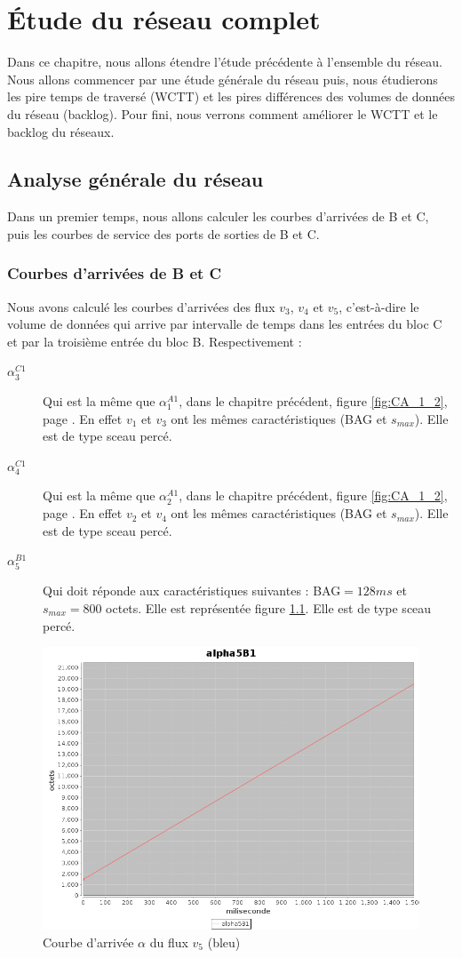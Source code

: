 \chapter{Étude du réseau complet}
Dans ce chapitre, nous allons étendre l'étude précédente à l'ensemble du réseau.
Nous allons commencer par une étude générale du réseau puis, nous étudierons les pire temps de traversé (WCTT) et les pires différences des volumes de données du réseau (backlog). Pour fini, nous verrons comment améliorer le WCTT et le backlog du réseaux.
\section{Analyse générale du réseau}
Dans un premier temps, nous allons calculer les courbes d'arrivées de B et C, puis les courbes de service des ports de sorties de B et C.
\subsection{Courbes d’arrivées de B et C}\label{sub:courbesArriveesB-C}
Nous avons calculé les courbes d'arrivées des flux $v_3$, $v_4$ et $v_5$, c'est-à-dire le volume de données qui arrive par intervalle de temps dans les entrées du bloc C et par la troisième entrée du bloc B. Respectivement : 
\begin{description}
\item[$\alpha_3^{C1}$ ] Qui est la même que $\alpha_1^{A1}$, dans le chapitre précédent, figure \ref{fig:CA_1_2}, page \pageref{fig:CA_1_2}. En effet $v_1$ et $v_3$ ont les mêmes caractéristiques (BAG et $s_{max}$). Elle est de type sceau percé.

\item[$\alpha_4^{C1}$ ] Qui est la même que $\alpha_2^{A1}$, dans le chapitre précédent, figure \ref{fig:CA_1_2}, page \pageref{fig:CA_1_2}. En effet $v_2$ et $v_4$ ont les mêmes caractéristiques (BAG et $s_{max}$). Elle est de type sceau percé.

\item[$\alpha_5^{B1}$ ] Qui doit réponde aux  caractéristiques suivantes : BAG$=128 ms$ et $s_{max}=800$ octets. Elle est représentée figure \ref{fig:CA_5}. Elle est de type sceau percé.
\end{description}

\begin{figure}[!ht]
\centering
\includegraphics[width = .6\textwidth]{./II/images/alpha_5.png}
\caption{\label{fig:CA_5}Courbe d'arrivée $\alpha$ du flux $v_5$ (bleu)}
\end{figure} 
